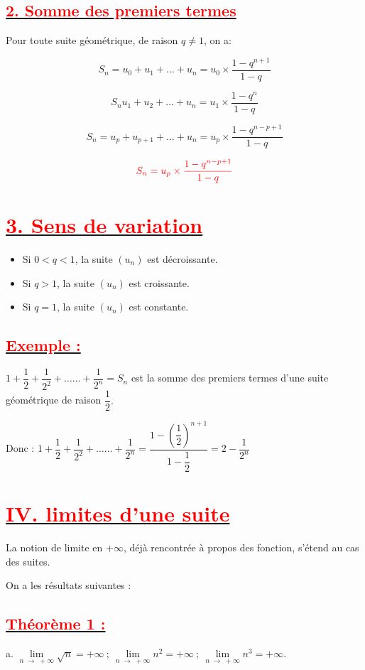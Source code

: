 \documentclass[12pt]{article}
\begin{document}
\subsection*{\underline{\textbf{\textcolor{red}{2. Somme des premiers termes }}}}

Pour toute suite géométrique, de raison $q\neq 1$, on a:

$$S_{n}=u_{0}+u_{1}+\ldots+u_{n}=u_{0}\times\dfrac{1-q^{n+1}}{1-q}$$

$$S_{n}u_{1}+u_{2}+\ldots+u_{n}=u_{1}\times\dfrac{1-q^{n}}{1-q}$$

$$S_{n}=u_{p}+u_{p+1}+\ldots+u_{n}=u_{p}\times\dfrac{1-q^{n-p+1}}{1-q}$$

\begin{mdframed}[linecolor=red] %
    \[
    \color{red} S_{n}=u_{p}\times\dfrac{1-q^{n-p+1}}{1-q}
    \]
\end{mdframed}
\section*{\underline{\textbf{\textcolor{red}{3. Sens de variation}}}}
    \begin{itemize}
        \item Si $0 < q < 1$, la suite $\left(u_{n}\right)$ est décroissante.
        \item Si $q > 1$, la suite $\left(u_{n}\right)$ est croissante.
        \item Si $q=1$, la suite $\left(u_{n}\right)$ est constante.
    \end{itemize}
\subsection*{\underline{\textbf{\textcolor{red}{Exemple :}}}}
$1+\dfrac{1}{2}+\dfrac{1}{2^{2}}+\ldots\ldots+\dfrac{1}{2^{n}}=S_{n}$ est la somme des premiers termes d'une suite géométrique de raison $\dfrac{1}{2}.$ 

Donc : $1+\dfrac{1}{2}+\dfrac{1}{2^{2}}+\ldots\ldots+\dfrac{1}{2^{n}}=\dfrac{1-\left(\dfrac{1}{2}\right)^{n+1}}{1-\dfrac{1}{2}}=2-\dfrac{1}{2^{n}}$
\section*{\underline{\textbf{\textcolor{red}{IV. limites d'une suite}}}}
La notion de limite en $+\infty$, déjà rencontrée à propos des fonction, s'étend au cas des suites.
	
On a les résultats suivantes :
\subsection*{\underline{\textbf{\textcolor{red}{Théorème 1 :}}}}
a. $\lim\limits_{n\;\longrightarrow\;+\infty}\sqrt{n}=+\infty\ ;\ \lim\limits_{n\;\longrightarrow\;+\infty}n^{2}=+\infty\ ;\ \lim\limits_{n\;\longrightarrow\;+\infty}n^{3}=+\infty.$
\end{document}
